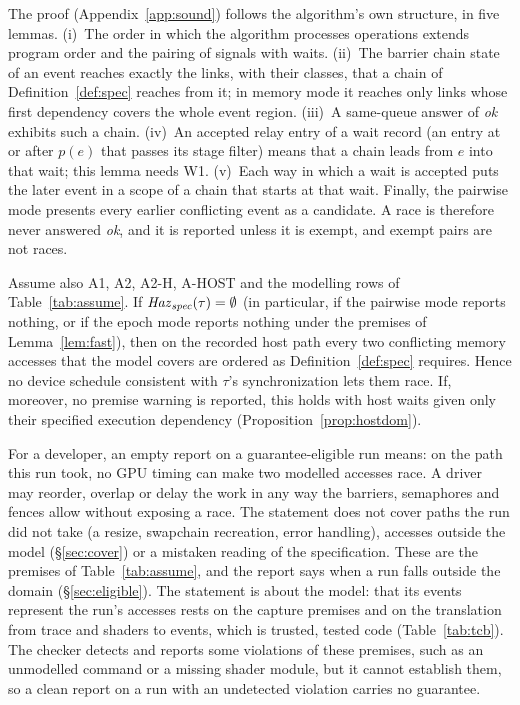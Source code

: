 The proof (Appendix~\ref{app:sound}) follows the algorithm's own structure, in five lemmas. (i)~The order in which the
algorithm processes operations extends program order and the pairing of signals with waits. (ii)~The barrier chain
state of an event reaches exactly the links, with their classes, that a chain of Definition~\ref{def:spec} reaches
from it; in memory mode it reaches only links whose first dependency covers the whole event region. (iii)~A same-queue answer of
\emph{ok} exhibits such a chain. (iv)~An accepted relay entry of a wait record (an entry at or after $p(e)$ that passes its stage filter)
means that a chain leads from $e$ into that wait; this lemma needs W1. (v)~Each way in which a wait is accepted puts
the later event in a scope of a chain that starts at that wait. Finally, the pairwise mode presents every
earlier conflicting event as a candidate. A race is therefore never answered \emph{ok}, and it is reported unless it
is exempt, and exempt pairs are not races.

\begin{corollary}\label{cor:sched}
Assume also A1, A2, A2-H, A-HOST and the modelling rows of Table~\ref{tab:assume}. If $\mathit{Haz}_{\mathit{spec}}(\tau) = \emptyset$
(in particular, if the pairwise mode reports nothing, or if the epoch mode reports nothing under the premises of
Lemma~\ref{lem:fast}), then on the recorded host path every two conflicting memory accesses that the model covers are
ordered as Definition~\ref{def:spec} requires. Hence no device schedule consistent with $\tau$'s synchronization lets
them race. If, moreover, no premise warning is reported, this holds with host waits given only their specified
execution dependency (Proposition~\ref{prop:hostdom}).
\end{corollary}

For a developer, an empty report on a guarantee-eligible run means: on the path this run took, no GPU timing can make
two modelled accesses race. A driver may reorder, overlap or delay the work in any way the barriers, semaphores and
fences allow without exposing a race. The statement does not cover paths the run did not take (a resize, swapchain
recreation, error handling), accesses outside the model (\S\ref{sec:cover}) or a mistaken reading of the
specification. These are the premises of Table~\ref{tab:assume}, and the report says when a run falls outside the
domain (\S\ref{sec:eligible}). The statement is about the model: that its events represent the run's accesses rests on
the capture premises and on the translation from trace and shaders to events, which is trusted, tested code
(Table~\ref{tab:tcb}). The checker detects and reports some violations of these premises, such as an unmodelled command
or a missing shader module, but it cannot establish them, so a clean report on a run with an undetected violation
carries no guarantee.

